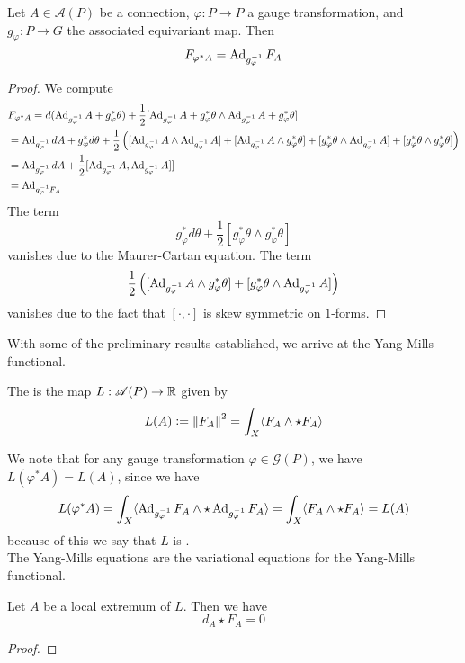 %
\begin{prop}
Let $A \in \mathscr{A}(P)$ be a connection, $\varphi : P \to P$ a gauge
transformation, and $g_\varphi : P \to G$ the associated equivariant map.
Then
\[
F_{\varphi^*A} = \operatorname{Ad}_{g_\varphi^{-1}}F_A
\]
\end{prop}
%
\begin{proof}
We compute
\begin{align*}
&F_{\varphi^*A} = d(\operatorname{Ad}_{g_\varphi^{-1}} A + g_\varphi^*\theta)
+ \frac{1}{2}[\operatorname{Ad}_{g_\varphi^{-1}} A + g_\varphi^*\theta\wedge
\operatorname{Ad}_{g_\varphi^{-1}} A + g_\varphi^*\theta] \\
&= \operatorname{Ad}_{g_\varphi^{-1}}dA + g_\varphi^*d\theta + \frac{1}{2}
\left([\operatorname{Ad}_{g_\varphi^{-1}}A\wedge \operatorname{Ad}_{g_\varphi^{-1}} A] + [\operatorname{Ad}_{g_\varphi^{-1}} A\wedge
g_\varphi^*\theta] + [g^*_\varphi\theta\wedge \operatorname{Ad}_{g_\varphi^{-1}}A]
+ [g_\varphi^*\theta\wedge g_\varphi^*\theta] \right) \\
&= \operatorname{Ad}_{g_\varphi^{-1}} dA + \frac{1}{2}[\operatorname{Ad}_{g_\varphi^{-1}}A, \operatorname{Ad}_{g_\varphi^{-1}} A]] \\
&= \operatorname{Ad}_{g_\varphi^{-1} F_A}
\end{align*}
%
The term
\[
g_\varphi^*d\theta + \frac{1}{2}[g_\varphi^*\theta\wedge g_\varphi^*\theta]
\]
vanishes due to the Maurer-Cartan equation. The term
\[
\frac{1}{2}\left([\operatorname{Ad}_{g_\varphi^{-1}} A\wedge
g_\varphi^*\theta] + [g^*_\varphi\theta\wedge \operatorname{Ad}_{g_\varphi^{-1}}A]\right)
\]
vanishes due to the fact that $[\cdot,\cdot]$ is skew symmetric on $1$-forms.
\end{proof}
%
With some of the preliminary results established, we arrive at the Yang-Mills
functional.
%
\begin{defn}
The  is the map $L : \mathscr{A}(P) \to \mathbb{R}$ given by
\[
L(A) \vcentcolon= \left\lVert F_A\right\rVert^2 = \int_X \langle F_A\wedge\star F_A\rangle
\]
\end{defn}
%
We note that for any gauge transformation $\varphi \in \mathscr{G}(P)$,
we have $L(\varphi^*A) = L(A)$, since we have
\[
L(\varphi^*A)
= \int_X\langle \operatorname{Ad}_{g_\varphi^{-1}}F_A\wedge\star\operatorname{Ad}_{g_\varphi^{-1}}F_A\rangle
= \int_X\langle F_A\wedge\star F_A\rangle = L(A)
\]
because of this we say that $L$ is . \\

The Yang-Mills equations are the variational equations for the Yang-Mills
functional.
%
\begin{prop}
Let $A$ be a local extremum of $L$. Then we have
\[
d_A\star F_A = 0
\]
\end{prop}
%
\begin{proof}

\end{proof}
%